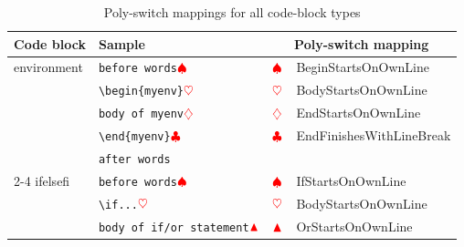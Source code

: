  \clearpage
 \begin{longtable}{llll}
  \caption{Poly-switch mappings for all code-block types}\label{tab:poly-switch-mapping}                                                                                                                                   \\
  \toprule
  Code block                             & Sample                                                            & \multicolumn{2}{c}{Poly-switch mapping}                                                                     \\
  \midrule
  environment                            & \verb!before words!$\color{red}\spadesuit$                        & $\color{red}\spadesuit$                 & BeginStartsOnOwnLine                                              \\
                                         & \verb!\begin{myenv}!$\color{red}\heartsuit$                        & $\color{red}\heartsuit$                  & BodyStartsOnOwnLine                                               \\
                                         & \verb!body of myenv!$\color{red}\diamondsuit$                         & $\color{red}\diamondsuit$                   & EndStartsOnOwnLine                                                \\
                                         & \verb!\end{myenv}!$\color{red}\clubsuit$                     & $\color{red}\clubsuit$             & EndFinishesWithLineBreak                                          \\
                                         & \verb!after words!                                                &                                         &                                                                   \\
  \cmidrule{2-4}
  ifelsefi                               & \verb!before words!$\color{red}\spadesuit$                        & $\color{red}\spadesuit$                 & IfStartsOnOwnLine                                                 \\
                                         & \verb!\if...!$\color{red}\heartsuit$                               & $\color{red}\heartsuit$                  & BodyStartsOnOwnLine                                               \\
                                         & \verb!body of if/or statement!$\color{red}\blacktriangle$                & $\color{red}\blacktriangle$                    & OrStartsOnOwnLine                                                 \\

\end{longtable}
